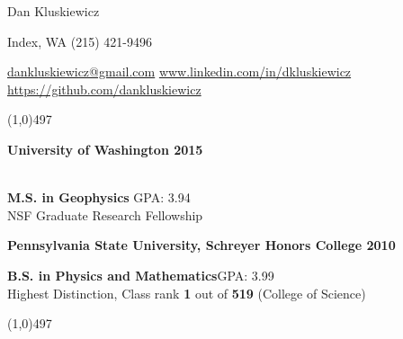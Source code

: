 \documentclass[10pt]{article} %
\begin{document}

\centerline{{\Huge \sc Dan Kluskiewicz}}  %
\centerline{Index, WA \textbullet \hspace{5pt} (215) 421-9496}
\centerline{\href{mailto:dankluskiewicz@gmail.com}{dankluskiewicz@gmail.com} 
\textbullet \hspace{5pt}  \url{www.linkedin.com/in/dkluskiewicz}
\textbullet \hspace{5pt}  \url{https://github.com/dankluskiewicz}
}

\noindent

\vspace{-2mm}
\noindent
\line(1,0){497}\\
\vspace{-3.5mm}

\begin{tcolorbox}
\noindent \centerline{\large \bf University of Washington \hfill 2015} \\
\textbf{M.S. in Geophysics} \hfill GPA: 3.94 \\
{\normalsize \hfill NSF Graduate Research Fellowship}
\end{tcolorbox}
\vspace{-1.5mm}

\vspace{-1mm}
\begin{tcolorbox}
\noindent \centerline{\large \bf Pennsylvania State University, Schreyer Honors College \hfill 2010}
\textbf{B.S. in Physics and Mathematics}\hfill GPA: 3.99\\
{\normalsize \hfill Highest Distinction, Class rank \textbf{1} out of \textbf{519} (College of Science)}
\end{tcolorbox}
\vspace{-1.5mm}


\vspace{-2.5mm}
\noindent
\line(1,0){497}\\
\vspace{-3.5mm}

\end{document}
